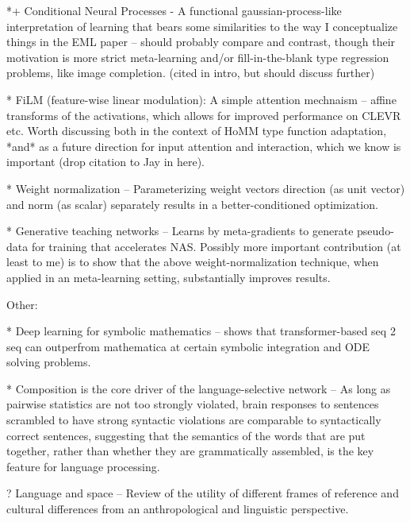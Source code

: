 *+ Conditional Neural Processes - A functional gaussian-process-like interpretation of learning that bears some similarities to the way I conceptualize things in the EML paper -- should probably compare and contrast, though their motivation is more strict meta-learning and/or fill-in-the-blank type regression problems, like image completion. \citep{Garnelo2018}  (cited in intro, but should discuss further)

* FiLM (feature-wise linear modulation): A simple attention mechnaism -- affine transforms of the activations, which allows for improved performance on CLEVR etc. Worth discussing both in the context of HoMM type function adaptation, *and* as a future direction for input attention and interaction, which we know is important (drop citation to Jay in here). \citep{Perez2018}

* Weight normalization -- Parameterizing weight vectors direction (as unit vector) and norm (as scalar) separately results in a better-conditioned optimization. \citep{Salimans2016}

* Generative teaching networks -- Learns by meta-gradients to generate pseudo-data for training that accelerates NAS. Possibly more important contribution (at least to me) is to show that the above weight-normalization technique, when applied in an meta-learning setting, substantially improves results. \citep{Such2019}


Other:

* Deep learning for symbolic mathematics -- shows that transformer-based seq 2 seq can outperfrom mathematica at certain symbolic integration and ODE solving problems. \citep{Lample2019} 

* Composition is the core driver of the language-selective network -- As long as pairwise statistics are not too strongly violated, brain responses to sentences scrambled to have strong syntactic violations are comparable to syntactically correct sentences, suggesting that the semantics of the words that are put together, rather than whether they are grammatically assembled, is the key feature for language processing. \citep{Mollica2020}

? Language and space -- Review of the utility of different frames of reference and cultural differences from an anthropological and linguistic perspective. \citep{Levinson1996}
